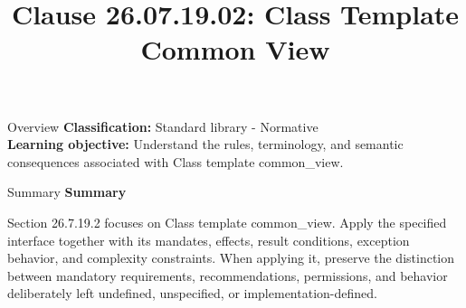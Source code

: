 \documentclass[10pt,letterpaper]{article}
\title{Clause 26.07.19.02: Class Template Common View}
\author{}
\date{}
\begin{document}
\maketitle
\begin{CornellOverviewBox}{Overview}
\textbf{Classification:} Standard library - Normative\\[2pt]
\textbf{Learning objective:} Understand the rules, terminology, and semantic consequences associated with Class template common\_view.
\end{CornellOverviewBox}\begin{CornellSummaryBox}{Summary}
{\sffamily\bfseries\color{Accent} Summary}\par\vspace{3pt}Section 26.7.19.2 focuses on Class template common\_view. Apply the specified interface together with its mandates, effects, result conditions, exception behavior, and complexity constraints. When applying it, preserve the distinction between mandatory requirements, recommendations, permissions, and behavior deliberately left undefined, unspecified, or implementation-defined.
\end{CornellSummaryBox}
\end{document}
